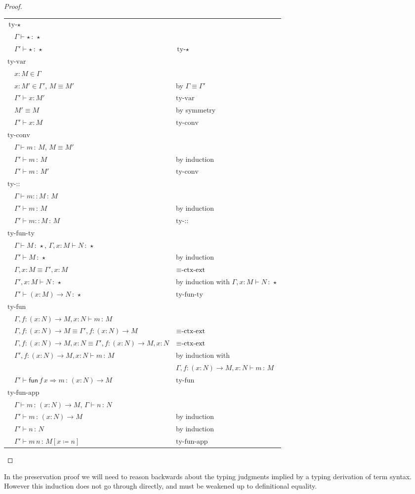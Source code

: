 \begin{proof}
\begin{tabular}{lll}
\multicolumn{3}{l}{$\textrm{ty-}\star$}\tabularnewline
 & $\Gamma\vdash\star\,:\,\star$ & \tabularnewline
 & $\Gamma'\vdash\star\,:\,\star$ & $\textrm{ty-}\star$\tabularnewline
\multicolumn{3}{l}{$\textrm{ty-var}$}\tabularnewline
 & $x:M\in\Gamma$ & \tabularnewline
 & $x:M'\in\Gamma'$, $M\equiv M'$ & by $\Gamma\equiv\Gamma'$\tabularnewline
 & $\Gamma'\vdash x:M'$ & $\textrm{ty-var}$\tabularnewline
 & $M'\equiv M$ & by symmetry\tabularnewline
 & $\Gamma'\vdash x:M$ & $\textrm{ty-conv}$\tabularnewline
\multicolumn{3}{l}{$\textrm{ty-conv}$}\tabularnewline
 & $\Gamma\vdash m\,:\,M$, $M\equiv M'$ & \tabularnewline
 & $\Gamma'\vdash m\,:\,M$ & by induction\tabularnewline
 & $\Gamma'\vdash m\,:\,M'$ & $\textrm{ty-conv}$\tabularnewline
\multicolumn{3}{l}{$\textrm{ty-::}$}\tabularnewline
 & $\Gamma\vdash m::M\,:\,M$ & \tabularnewline
 & $\Gamma'\vdash m\,:\,M$ & by induction\tabularnewline
 & $\Gamma'\vdash m::M\,:\,M$ & $\textrm{ty-::}$\tabularnewline
\multicolumn{3}{l}{$\textrm{ty-fun-ty}$}\tabularnewline
 & $\Gamma\vdash M\,:\,\star$, $\Gamma,x:M\vdash N\,:\,\star$ & \tabularnewline
 & $\Gamma'\vdash M\,:\,\star$ & by induction\tabularnewline
 & $\Gamma,x:M\equiv\Gamma',x:M$ & $\textrm{\ensuremath{\equiv}-ctx-ext}$\tabularnewline
 & $\Gamma',x:M\vdash N\,:\,\star$ & by induction with $\Gamma,x:M\vdash N\,:\,\star$\tabularnewline
 & $\Gamma'\vdash\left(x:M\right)\rightarrow N\,:\,\star$ & $\textrm{ty-fun-ty}$\tabularnewline
\multicolumn{3}{l}{$\textrm{ty-fun}$}\tabularnewline
 & $\Gamma,f:\left(x:N\right)\rightarrow M,x:N\vdash m\,:\,M$ & \tabularnewline
 & $\Gamma,f:\left(x:N\right)\rightarrow M\equiv\Gamma',f:\left(x:N\right)\rightarrow M$ & $\textrm{\ensuremath{\equiv}-ctx-ext}$\tabularnewline
 & $\Gamma,f:\left(x:N\right)\rightarrow M,x:N\equiv\Gamma',f:\left(x:N\right)\rightarrow M,x:N$ & $\textrm{\ensuremath{\equiv}-ctx-ext}$\tabularnewline
 & $\Gamma',f:\left(x:N\right)\rightarrow M,x:N\vdash m\,:\,M$ & by induction with\tabularnewline
 &  & $\Gamma,f:\left(x:N\right)\rightarrow M,x:N\vdash m\,:\,M$\tabularnewline
 & $\Gamma'\vdash\mathsf{fun}\,f\,x\Rightarrow m\,:\,\left(x:N\right)\rightarrow M$ & $\textrm{ty-fun}$\tabularnewline
\multicolumn{3}{l}{$\textrm{ty-fun-app}$}\tabularnewline
 & $\Gamma\vdash m\,:\,\left(x:N\right)\rightarrow M$, $\Gamma\vdash n\,:\,N$ & \tabularnewline
 & $\Gamma'\vdash m\,:\,\left(x:N\right)\rightarrow M$ & by induction\tabularnewline
 & $\Gamma'\vdash n\,:\,N$ & by induction\tabularnewline
 & $\Gamma'\vdash m\,n\,:\,M\left[x\coloneqq n\right]$ & $\textrm{ty-fun-app}$\tabularnewline
\end{tabular}
\end{proof}
In the preservation proof we will need to reason backwards about the typing judgments implied by a typing derivation of term syntax.
However this induction does not go through directly, and must be weakened up to definitional equality.

